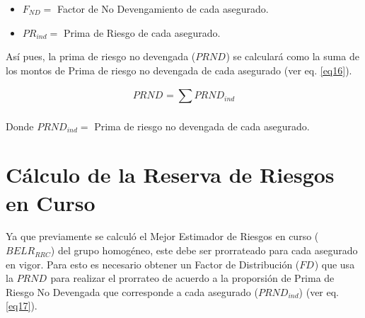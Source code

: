 \documentclass[11pt,twoside,openright,spanish]{report}
\numberwithin{equation}{chapter}
\numberwithin{figure}{chapter}
\numberwithin{table}{chapter}
\begin{document}
\begin{itemize}
	\setlength\itemsep{-0.5em}	 
	
	\item $F_{ND}=$ Factor de No Devengamiento de cada asegurado.
	
	\item $PR_{ind}=$ Prima de Riesgo de cada asegurado.
\end{itemize}


\begin{comment}

Mientras que para las pólizas emitidas anticipadamente que, al momento de la valuación, no han iniciado vigencia, la prima de riesgo no devengada se calculará como la diferencia entre la Prima de Tarifa de cada asegurado y el Monto de Gastos de Administración no devengado de cada asegurado (ver eq. \ref{eq15}).



\begin{equation}
	{PRND}_{ind}^{}={{PT}_{ind}-BELG_{ADM,ind}}
	\label{eq15}
\end{equation}


Donde


\begin{itemize}
	\setlength\itemsep{-0.5em}
	\item $PT_{ind}=$ Prima de Tarifa de cada asegurado.
	
	\item $BELG_{ADM,ind}=$ Monto de los gastos de administración no devengado de cada asegurado.
\end{itemize}
\end{comment}

Así pues, la prima de riesgo no devengada ($PRND_{}$) se calculará como la suma de los montos de Prima de riesgo no devengada de cada asegurado (ver eq. \ref{eq16}).

\begin{equation}
	PRND_{}={\sum _{}^{}PRND_{ind}^{}}
	\label{eq16}
\end{equation}


Donde $PRND_{ind}=$ Prima de riesgo no devengada de cada asegurado.


	 
	 	\chapter{Cálculo de la Reserva de Riesgos en Curso}\label{metnum}
	 
	 Ya que previamente se calculó el Mejor Estimador de Riesgos en curso ($BELR_{RRC}$) del grupo homogéneo, este debe ser prorrateado para cada asegurado en vigor. Para esto es necesario obtener un Factor de Distribución ($FD_{}$) que usa la $PRND_{}$ para realizar el prorrateo de acuerdo a la proporsión de Prima de Riesgo No Devengada que corresponde a cada asegurado ($PRND_{ind}$) (ver eq. \ref{eq17}).
	 
\end{document}

